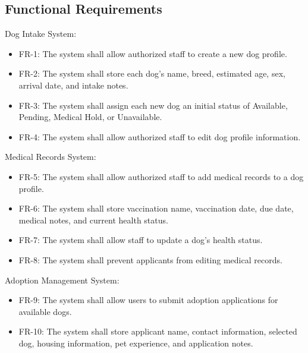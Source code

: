 \documentclass[12pt]{article}
\begin{document}
\subsection{Functional Requirements}
Dog Intake System:
\begin{itemize}\item FR-1: The system shall allow authorized staff to create a new dog profile.\end{itemize}
\begin{itemize}\item FR-2: The system shall store each dog’s name, breed, estimated age, sex, arrival date, and intake notes.\end{itemize}
\begin{itemize}\item FR-3: The system shall assign each new dog an initial status of Available, Pending, Medical Hold, or Unavailable.\end{itemize}
\begin{itemize}\item FR-4: The system shall allow authorized staff to edit dog profile information.\end{itemize}
Medical Records System:
\begin{itemize}\item FR-5: The system shall allow authorized staff to add medical records to a dog profile.\end{itemize}
\begin{itemize}\item FR-6: The system shall store vaccination name, vaccination date, due date, medical notes, and current health status.\end{itemize}
\begin{itemize}\item FR-7: The system shall allow staff to update a dog’s health status.\end{itemize}
\begin{itemize}\item FR-8: The system shall prevent applicants from editing medical records.\end{itemize}
Adoption Management System:
\begin{itemize}\item FR-9: The system shall allow users to submit adoption applications for available dogs.\end{itemize}
\begin{itemize}\item FR-10: The system shall store applicant name, contact information, selected dog, housing information, pet experience, and application notes.\end{itemize}
\end{document}
